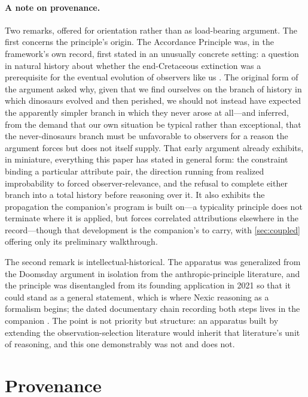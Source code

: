 \paragraph{A note on provenance.} Two remarks, offered for orientation rather than as load-bearing argument. The first concerns the principle's origin. The Accordance Principle was, in the framework's own record, first stated in an unusually concrete setting: a question in natural history about whether the end-Cretaceous extinction was a prerequisite for the eventual evolution of observers like us \cite{Nexus}. The original form of the argument asked why, given that we find ourselves on the branch of history in which dinosaurs evolved and then perished, we should not instead have expected the apparently simpler branch in which they never arose at all---and inferred, from the demand that our own situation be typical rather than exceptional, that the never-dinosaurs branch must be unfavorable to observers for a reason the argument forces but does not itself supply. That early argument already exhibits, in miniature, everything this paper has stated in general form: the constraint binding a particular attribute pair, the direction running from realized improbability to forced observer-relevance, and the refusal to complete either branch into a total history before reasoning over it. It also exhibits the propagation the companion's program is built on---a typicality principle does not terminate where it is applied, but forces correlated attributions elsewhere in the record---though that development is the companion's to carry, with \autoref{sec:coupled} offering only its preliminary walkthrough.

The second remark is intellectual-historical. The apparatus was generalized from the Doomsday argument \cite{gott1993implications, leslie1996end} in isolation from the anthropic-principle literature, and the principle was disentangled from its founding application in 2021 so that it could stand as a general statement, which is where Nexic reasoning as a formalism begins; the dated documentary chain recording both steps lives in the companion \cite{Nexus}. The point is not priority but structure: an apparatus built by extending the observation-selection literature would inherit that literature's unit of reasoning, and this one demonstrably was not and does not.

\section*{Provenance}

